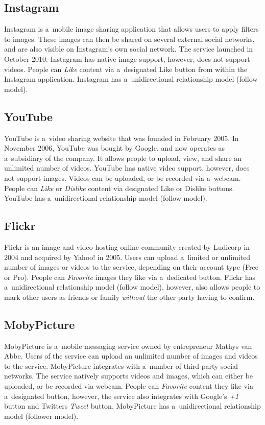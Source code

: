 \subsection{Instagram}
Instagram is a~mobile image sharing application that allows users to apply filters to images.
These images can then be shared on several external social networks,
and are also visible on Instagram's own social network.
The service launched in October 2010.
Instagram has native image support, however, does not support videos.
People can \emph{Like} content via a~designated Like button
from within the Instagram application.
Instagram has a~unidirectional relationship model (follow model).

\subsection{YouTube}
YouTube is a~video sharing website that was founded in February 2005.
In November 2006, YouTube was bought by Google,
and now operates as a~subsidiary of the company.
It allows people to upload, view, and share an unlimited number of videos.
YouTube has native video support, however, does not support images.
Videos can be uploaded, or be recorded via a~webcam.
People can \emph{Like} or \emph{Dislike} content via designated Like or Dislike buttons.
YouTube has a~unidirectional relationship model (follow model).

\subsection{Flickr}
Flickr is an image and video hosting online community created by Ludicorp in 2004
and acquired by Yahoo! in 2005.
Users can upload a~limited or unlimited number of images or videos to the service,
depending on their account type (Free or Pro). 
People can \emph{Favorite} images they like via a~dedicated button.
Flickr has a~unidirectional relationship model (follow model), however,
also allows people to mark other users as friends or family \emph{without}
the other party having to confirm.

\subsection{MobyPicture}
MobyPicture is a~mobile messaging service owned by entrepreneur Mathys van Abbe.
Users of the service can upload an unlimited number of images and videos to the service.
MobyPicture integrates with a~number of third party social networks.
The service natively supports videos and images,
which can either be uploaded, or be recorded via webcam.
People can \emph{Favorite} content they like via a~designated button,
however, the service also integrates with Google's \emph{+1} button and
Twitters \emph{Tweet} button. 
MobyPicture has a~unidirectional relationship model (follower model).

